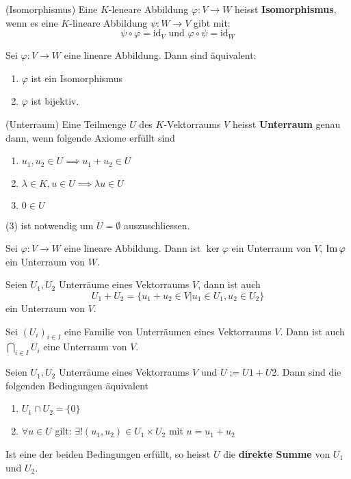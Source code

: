 \documentclass[../Algebra_script.tex]{subfiles}
\begin{document}
\begin{definition}{(Isomorphismus)}
	Eine $K$-leneare Abbildung $\varphi:V \to W$ heisst \textbf{Isomorphismus}, wenn es eine $K$-lineare Abbildung $\psi:W \to V$ gibt mit:
	\[\psi \circ \varphi = \mathrm{id}_V \text{ und } \varphi \circ \psi = \mathrm{id}_W\] 
\end{definition}

\begin{proposition}
	Sei $\varphi: V \to W$ eine lineare Abbildung. Dann sind äquivalent:
	\begin{enumerate}
		\item $\varphi$ ist ein Isomorphismus
		\item $\varphi$ ist bijektiv.
	\end{enumerate}
\end{proposition}

\begin{definition}{(Unterraum)}
	Eine Teilmenge $U$ des $K$-Vektorraums $V$ heisst \textbf{Unterraum} genau dann, wenn folgende Axiome erfüllt sind
	\begin{enumerate}
		\item $u_1, u_2 \in U \implies u_1 + u_2 \in U$
		\item $\lambda \in K, u \in U \implies \lambda u \in U$
		\item $0 \in U$ 
	\end{enumerate}
	(3) ist notwendig um $U = \emptyset$ auszuschliessen.
\end{definition}

\begin{proposition}
	Sei $\varphi : V \to W$ eine lineare Abbildung. Dann ist $\ker \varphi$ ein Unterraum von $V$, $\operatorname{Im} \varphi$ ein Unterraum von $W$.
\end{proposition}

\begin{proposition}
	Seien $U_1, U_2$ Unterräume eines Vektorraums $V$, dann ist auch 
	\[U_1 + U_2 = \{u_1 + u_2 \in V| u_1 \in U_1, u_2 \in U_2\}\]
	ein Unterraum von $V$. 
\end{proposition}

\begin{proposition}
	Sei $(U_i)_{i \in I}$ eine Familie von Unterräumen eines Vektorraums $V$. Dann ist auch $\bigcap_{i \in I} U_i$ eine Unterraum von $V$.
\end{proposition}

\begin{proposition}
	Seien $U_1, U_2$ Unterräume eines Vektorraums $V$ und $U := U1 + U2$. Dann sind die folgenden Bedingungen äquivalent
	\begin{enumerate}
		\item $U_1 \cap U_2 = \{0\}$ 
		\item $\forall u \in U$ gilt: $\exists! (u_1, u_2) \in U_1 \times U_2$ mit $u = u_1 + u_2$ 
	\end{enumerate}
	Ist eine der beiden Bedingungen erfüllt, so heisst $U$ die \textbf{direkte Summe} von $U_1$ und $U_2$.
\end{proposition}
\end{document}
